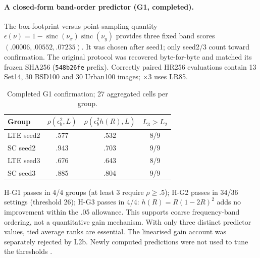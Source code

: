 \paragraph{A closed-form band-order predictor (G1, completed).}
The box-footprint versus point-sampling quantity
$\epsilon(\nu)=1-\operatorname{sinc}(\nu_x)\operatorname{sinc}(\nu_y)$
provides three fixed band scores $(.00006,.00552,.07235)$. It was chosen
after seed1; only seed2/3 count toward confirmation. The original protocol
was recovered byte-for-byte and matched its frozen SHA256
(\texttt{548b26fe} prefix). Correctly paired HR256 evaluations contain
13 Set14, 30 BSD100 and 30 Urban100 images; $\times3$ uses LR85.
\begin{table}[t]\centering\small
\caption{Completed G1 confirmation; 27 aggregated cells per group.}
\label{tab:g1}
\begin{tabular}{lccc}\toprule
Group & $\rho(\epsilon_b^2,L)$ & $\rho(\epsilon_b^2h(R),L)$ & $L_3>L_2$\\\midrule
LTE seed2 & .577 & .532 & 8/9\\
SC seed2 & .943 & .703 & 9/9\\
LTE seed3 & .676 & .643 & 8/9\\
SC seed3 & .885 & .804 & 9/9\\\bottomrule
\end{tabular}
\end{table}
H-G1 passes in 4/4 groups (at least 3 require $\rho\ge.5$); H-G2
passes in 34/36 settings (threshold 26); H-G3 passes in 4/4:
$h(R)=R(1-2R)^2$ adds no improvement within the .05 allowance.
This supports coarse frequency-band ordering, not a quantitative gain
mechanism. With only three distinct predictor values, tied average ranks
are essential. The linearised gain account was separately rejected by
L2b. Newly computed predictions were not used to tune the thresholds
.

